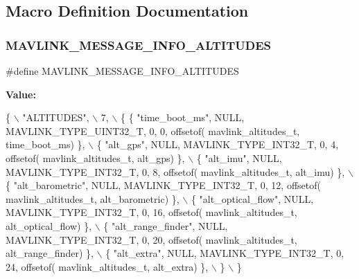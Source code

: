 \subsection{Macro Definition Documentation}
\mbox{\label{mavlink__msg__altitudes_8h_a23495faddc7777bfd2d9ee6a63395ce4}} 
\subsubsection{M\+A\+V\+L\+I\+N\+K\+\_\+\+M\+E\+S\+S\+A\+G\+E\+\_\+\+I\+N\+F\+O\+\_\+\+A\+L\+T\+I\+T\+U\+D\+ES}
{\footnotesize\ttfamily \#define M\+A\+V\+L\+I\+N\+K\+\_\+\+M\+E\+S\+S\+A\+G\+E\+\_\+\+I\+N\+F\+O\+\_\+\+A\+L\+T\+I\+T\+U\+D\+ES}

{\bfseries Value\+:}
\begin{DoxyCode}
\{ \(\backslash\)
    \textcolor{stringliteral}{"ALTITUDES"}, \(\backslash\)
    7, \(\backslash\)
    \{  \{ \textcolor{stringliteral}{"time\_boot\_ms"}, NULL, MAVLINK_TYPE_UINT32_T, 0, 0, offsetof(
      mavlink_altitudes_t, time\_boot\_ms) \}, \(\backslash\)
         \{ \textcolor{stringliteral}{"alt\_gps"}, NULL, MAVLINK_TYPE_INT32_T, 0, 4, offsetof(
      mavlink_altitudes_t, alt\_gps) \}, \(\backslash\)
         \{ \textcolor{stringliteral}{"alt\_imu"}, NULL, MAVLINK_TYPE_INT32_T, 0, 8, offsetof(
      mavlink_altitudes_t, alt\_imu) \}, \(\backslash\)
         \{ \textcolor{stringliteral}{"alt\_barometric"}, NULL, MAVLINK_TYPE_INT32_T, 0, 12, offsetof(
      mavlink_altitudes_t, alt\_barometric) \}, \(\backslash\)
         \{ \textcolor{stringliteral}{"alt\_optical\_flow"}, NULL, MAVLINK_TYPE_INT32_T, 0, 16, offsetof(
      mavlink_altitudes_t, alt\_optical\_flow) \}, \(\backslash\)
         \{ \textcolor{stringliteral}{"alt\_range\_finder"}, NULL, MAVLINK_TYPE_INT32_T, 0, 20, offsetof(
      mavlink_altitudes_t, alt\_range\_finder) \}, \(\backslash\)
         \{ \textcolor{stringliteral}{"alt\_extra"}, NULL, MAVLINK_TYPE_INT32_T, 0, 24, offsetof(
      mavlink_altitudes_t, alt\_extra) \}, \(\backslash\)
         \} \(\backslash\)
\}
\end{DoxyCode}
\mbox{\label{mavlink__msg__altitudes_8h_a61ecb656779dd893ec92ac920a2ae2a5}} 

